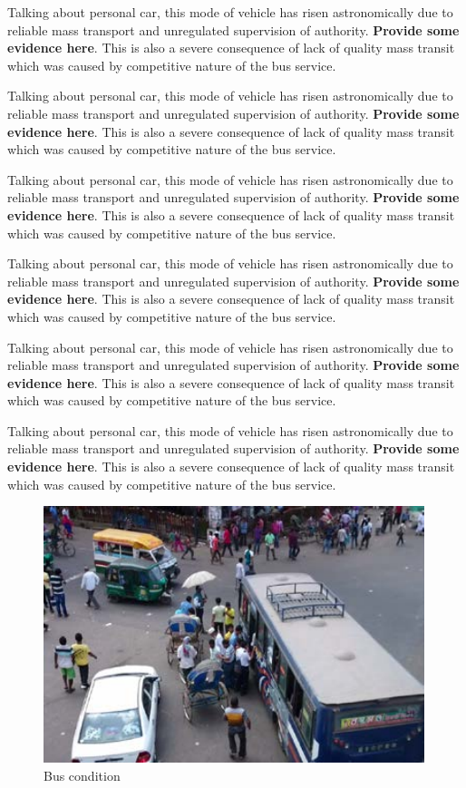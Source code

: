 \documentclass[
  11pt,
]{article}
\begin{document}
Talking about personal car, this mode of vehicle has risen
astronomically due to reliable mass transport and unregulated
supervision of authority. \textbf{Provide some evidence here}. This is
also a severe consequence of lack of quality mass transit which was
caused by competitive nature of the bus service.

Talking about personal car, this mode of vehicle has risen
astronomically due to reliable mass transport and unregulated
supervision of authority. \textbf{Provide some evidence here}. This is
also a severe consequence of lack of quality mass transit which was
caused by competitive nature of the bus service.

Talking about personal car, this mode of vehicle has risen
astronomically due to reliable mass transport and unregulated
supervision of authority. \textbf{Provide some evidence here}. This is
also a severe consequence of lack of quality mass transit which was
caused by competitive nature of the bus service.

Talking about personal car, this mode of vehicle has risen
astronomically due to reliable mass transport and unregulated
supervision of authority. \textbf{Provide some evidence here}. This is
also a severe consequence of lack of quality mass transit which was
caused by competitive nature of the bus service.

Talking about personal car, this mode of vehicle has risen
astronomically due to reliable mass transport and unregulated
supervision of authority. \textbf{Provide some evidence here}. This is
also a severe consequence of lack of quality mass transit which was
caused by competitive nature of the bus service.

Talking about personal car, this mode of vehicle has risen
astronomically due to reliable mass transport and unregulated
supervision of authority. \textbf{Provide some evidence here}. This is
also a severe consequence of lack of quality mass transit which was
caused by competitive nature of the bus service.

\begin{figure}  
 \begin{center}
    \includegraphics{./figures/rtsp_bus_condition3.png}  
  \caption{Bus condition} 
\end{center}
\end{figure}
\end{document}
